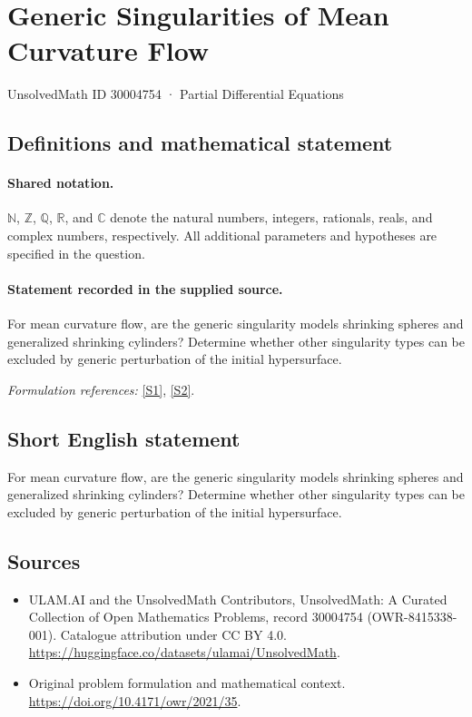 \documentclass[11pt]{article}
\newcommand{\sref}[2]{\hyperlink{source:#1:#2}{[S#2]}}
\begin{document}
\setcounter{section}{30004753}
\section{Generic Singularities of Mean Curvature Flow}\label{30004754}
{\small UnsolvedMath ID 30004754 · Partial Differential Equations}
\subsection{Definitions and mathematical statement}

\paragraph{Shared notation.}$\mathbb N$, $\mathbb Z$, $\mathbb Q$, $\mathbb R$, and $\mathbb C$ denote the natural numbers, integers, rationals, reals, and complex numbers, respectively. All additional parameters and hypotheses are specified in the question.


\paragraph{Statement recorded in the supplied source.}
For mean curvature flow, are the generic singularity models shrinking spheres and generalized shrinking cylinders? Determine whether other singularity types can be excluded by generic perturbation of the initial hypersurface.
\par\smallskip\textit{Formulation references:} \sref{30004754}{1}, \sref{30004754}{2}.
\subsection{Short English statement}
For mean curvature flow, are the generic singularity models shrinking spheres and generalized shrinking cylinders? Determine whether other singularity types can be excluded by generic perturbation of the initial hypersurface.
\subsection{Sources}
\begin{itemize}
\item[\hypertarget{source:30004754:1}{S1}] ULAM.AI and the UnsolvedMath Contributors, UnsolvedMath: A Curated Collection of Open Mathematics Problems, record 30004754 (OWR-8415338-001). Catalogue attribution under CC BY 4.0.
\url{https://huggingface.co/datasets/ulamai/UnsolvedMath}.
\item[\hypertarget{source:30004754:2}{S2}] Original problem formulation and mathematical context.
\url{https://doi.org/10.4171/owr/2021/35}.
\end{itemize}
\label{end:30004754}
\end{document}
